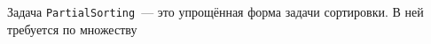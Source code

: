 \newcommand{\PartSort}{\texttt{PartialSorting}\xspace}
\newcommand{\IncSort}{\texttt{IncrementalSorting}\xspace}

Задача \PartSort~--- это упрощённая форма задачи сортировки.
В ней требуется по множеству 
